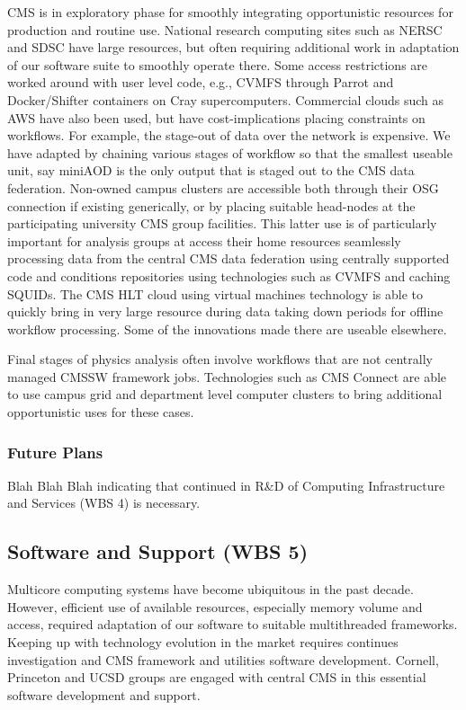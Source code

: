 \documentclass[11pt,a4paper]{article}
\begin{document}

CMS is in exploratory phase for smoothly integrating opportunistic
resources for production and routine use. National research computing
sites such as NERSC and SDSC have large resources, but often requiring
additional work in adaptation of our software suite to smoothly
operate there. Some access restrictions are worked around with user
level code, e.g., CVMFS through Parrot and Docker/Shifter containers
on Cray supercomputers. Commercial clouds such as AWS have also been
used, but have cost-implications placing constraints on workflows. For
example, the stage-out of data over the network is expensive. We have
adapted by chaining various stages of workflow so that the smallest
useable unit, say miniAOD is the only output that is staged out to the
CMS data federation. Non-owned campus clusters are accessible both
through their OSG connection if existing generically, or by placing
suitable head-nodes at the participating university CMS group
facilities. This latter use is of particularly important for analysis
groups at access their home resources seamlessly processing data from
the central CMS data federation using centrally supported code and
conditions repositories using technologies such as CVMFS and caching
SQUIDs. The CMS HLT cloud using virtual machines technology is able to
quickly bring in very large resource during data taking down periods
for offline workflow processing. Some of the innovations made there
are useable elsewhere.

Final stages of physics analysis often involve workflows that are not
centrally managed CMSSW framework jobs. Technologies such as CMS
Connect are able to use campus grid and department level computer
clusters to bring additional opportunistic uses for these cases.

\subsubsection{Future Plans}

Blah Blah Blah indicating that continued in R\&D of {Computing Infrastructure and Services (WBS 4)}
is necessary.

\subsection{Software and Support (WBS 5)}

Multicore computing systems have become ubiquitous in the past
decade. However, efficient use of available resources, especially
memory volume and access, required adaptation of our software to
suitable multithreaded frameworks. Keeping up with technology
evolution in the market requires continues investigation and CMS
framework and utilities software development.  Cornell, Princeton and
UCSD groups are engaged with central CMS in this essential software
development and support.
\end{document}
